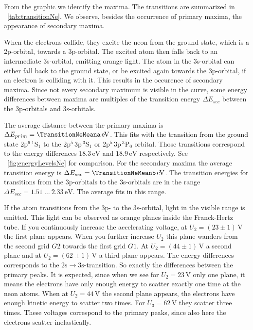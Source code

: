 \documentclass[a4paper,10pt,twocolumn]{article}
\newcommand{\volt}{\, \mathrm{V}}
\newcommand{\eV}{\, \mathrm{eV}}
\newcommand{\neLevelA}{2\mathrm{p}^{5} \, 3\mathrm{p} \, ^{3}\mathrm{P}_0}
\newcommand{\neLevelAA}{2\mathrm{p}^{5} \, 3\mathrm{p} \, ^{3}\mathrm{S}_1}
\newcommand{\neLevelGround}{2\mathrm{p}^{6} \, ^{1}\mathrm{S}_1}
\newcommand{\TheoreticalTransitionNea}{18.9}
\newcommand{\TheoreticalTransitionNeaa}{18.3}
\newcommand{\TheoreticalTransitionNeb}{1.51 \ \dots \ 2.33}
\begin{document}
    From the graphic we identify the maxima.
    The transitions are summarized in ~\autoref{tab:transitionNe}.
    We observe, besides the occurrence of primary maxima, the appearance of secondary maxima.
    
    When the electrons collide, they excite the neon from the ground state, which is a 2p-orbital, towards a 3p-orbital.
    The excited atom then falls back to an intermediate 3s-orbital, emitting orange light.
    The atom in the 3s-orbital can either fall back to the ground state, or be excited again towards the
    3p-orbital, if an electron is colliding with it.
    This results in the occurence of secondary maxima.
    Since not every secondary maximum is visible in the curve, some energy differences
    between maxima are multiples of the transition energy $\Delta E_{sec}$
    between the 3p-orbitals and 3s-orbitals.
    
    The average distance between the primary maxima is $\Delta E_{prim} = \TransitionNeMeana \eV$.
    This fits with the transition from the ground state $\neLevelGround$ to the $\neLevelAA$ or $\neLevelA$ orbital.
    Those transitions correspond to the energy differences $\TheoreticalTransitionNeaa \eV$ and $\TheoreticalTransitionNea \eV$
    respectively.
    See ~\autoref{fig:energyLevelsNe} for comparison.
    For the secondary maxima the average transition energy is $\Delta E_{sec} = \TransitionNeMeanb \eV$.
    The transition energies for transitions from the 3p-orbitals to the 3s-orbitals are in the range
    $\Delta E_{sec} = \TheoreticalTransitionNeb \eV$.
    The average fits in this range.
    
    If the atom transitions from the 3p- to the 3s-orbital, light in the visible range is emitted.
    This light can be observed as orange planes inside the Franck-Hertz tube.
    If you continuously increase the accelerating voltage, at $U_2 = (23 \pm 1) \volt$ the first plane appears.
    When you further increase $U_2$ this plane wanders from the second grid $G2$ towards the first grid $G1$.
    At $U_2 = (44 \pm 1)\volt$ a second plane and at $U_2 = (62 \pm 1)\volt$ a third plane appears.
    The energy differences corresponds to the $\mathrm{2s} \rightarrow \mathrm{3s}$-transition.
    So exactly the differences between the primary peaks.
    It is expected, since when we see for $U_2 = 23 \volt$ only one plane, it means the electrons have only
    enough energy to scatter exactly one time at the neon atoms.
    When at $U_2 = 44 \volt$ the second plane appears, the electrons have enough kinetic energy to scatter
    two times.
    For $U_3 = 62 \volt$ they scatter three times.
    These voltages correspond to the primary peaks, since also here the electrons scatter inelastically.
    
\end{document}
